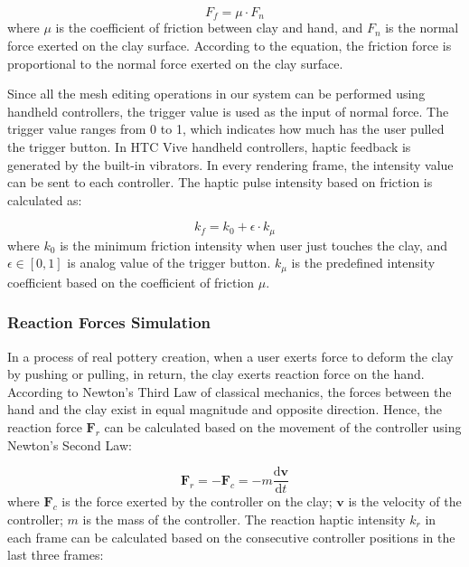 \documentclass{svjour3}                     %
\begin{document}
{\begin{equation}
F_{f} = \mu \cdot F_{n}
\end{equation}
where $\mu$ is the coefficient of friction between clay and hand, and $F_{n}$ is the normal force exerted on the clay surface. According to the equation, the friction force is proportional to the normal force exerted on the clay surface.

Since all the mesh editing operations in our system can be performed using handheld controllers, the trigger value is used as the input of normal force.
The trigger value ranges from 0 to 1, which indicates how much has the user pulled the trigger button.
In HTC Vive handheld controllers, haptic feedback is generated by the built-in vibrators. In every rendering frame, the intensity value can be sent to each controller.
The haptic pulse intensity based on friction is calculated as:

\begin{equation}
k_{f} = k_{0} + \epsilon \cdot k_{\mu}
\end{equation}
where $k_{0}$ is the minimum friction intensity when user just touches the clay, and $\epsilon \in [0,1]$ is analog value of the trigger button. $k_{\mu}$ is the predefined intensity coefficient based on the coefficient of friction $\mu$.


\subsubsection{Reaction Forces Simulation}

In a process of real pottery creation, when a user exerts force to deform the clay by pushing or pulling, in return, the clay exerts reaction force on the hand.
According to Newton's Third Law of classical mechanics, the forces between the hand and the clay exist in equal magnitude and opposite direction.
Hence, the reaction force $\mathbf{F}_{r}$ can be calculated based on the movement of the controller using Newton's Second Law:

\begin{equation}
\mathbf{F}_{r} = -\mathbf{F}_{c} = -m \frac{\mathrm{d} \mathbf{v}}{\mathrm{d} t}
\end{equation}
where $\mathbf{F}_{c}$ is the force exerted by the controller on the clay; $\mathbf{v}$ is the velocity of the controller; $m$ is the mass of the controller.
The reaction haptic intensity $k_{r}$ in each frame can be calculated based on the consecutive controller positions in the last three frames:

}
\end{document}
